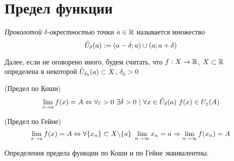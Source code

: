 \section{Предел функции}

\begin{definition}
	\textit{Проколотой $\delta$-окрестностью} точки $a \in \mathbb{R}$ называется множество
	$$
		\mathring{U}_{\delta}(a) := (a - \delta; a) \cup (a; a + \delta)
	$$
\end{definition}

\begin{note}
	Далее, если не оговорено иного, будем считать, что $f : X \rightarrow \mathbb{R}$, $X \subset \mathbb{R}$ определена в некоторой $\mathring{U}_{\delta_0}(a) \subset X$, $\delta_0 > 0$
\end{note}

\begin{definition} (Предел по Коши)
	$$
		\lim\limits_{x \to a} f(x) = A \Leftrightarrow \forall \varepsilon > 0\ \exists \delta > 0\ |\ \forall x \in \mathring{U}_{\delta}(a)\ f(x) \in U_{\varepsilon}(A)
	$$
\end{definition}

\begin{definition} (Предел по Гейне)
	$$
		\lim\limits_{x \to a} f(x) = A \Leftrightarrow \forall \{x_n\} \subset X \backslash \{a\}\ \lim\limits_{n \to \infty} x_n = a \Rightarrow \lim\limits_{n \to \infty} f(x_n) = A
	$$
\end{definition}

\begin{theorem}
	Определения предела функции по Коши и по Гейне эквивалентны.
\end{theorem}

